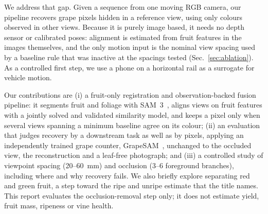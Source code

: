 We address that gap. Given a sequence from one moving RGB camera, our pipeline recovers grape pixels hidden in a reference view, using only colours observed in other views. Because it is purely image based, it needs no depth sensor or calibrated poses: alignment is estimated from fruit features in the images themselves, and the only motion input is the nominal view spacing used by a baseline rule that was inactive at the spacings tested (Sec.~\ref{sec:ablation}). As a controlled first step, we use a phone on a horizontal rail as a surrogate for vehicle motion.

Our contributions are (i) a fruit-only registration and observation-backed fusion pipeline: it segments fruit and foliage with SAM~3~\cite{carion2025}, aligns views on fruit features with a jointly solved and validated similarity model, and keeps a pixel only when several views spanning a minimum baseline agree on its colour; (ii) an evaluation that judges recovery by a downstream task as well as by pixels, applying an independently trained grape counter, GrapeSAM~\cite{tong2026vivid}, unchanged to the occluded view, the reconstruction and a leaf-free photograph; and (iii) a controlled study of viewpoint spacing (20--60~mm) and occlusion (3--6 foreground branches), including where and why recovery fails.
We also briefly explore separating red and green fruit, a step toward the ripe and unripe estimate that the title names. This report evaluates the occlusion-removal step only; it does not estimate yield, fruit mass, ripeness or vine health.
